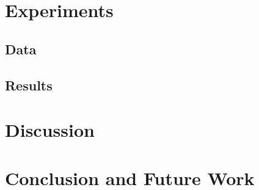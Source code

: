 \documentclass[runningheads]{llncs}
\begin{document}
\section{Experiments}
\subsection{Data}
\subsection{Results}
\section{Discussion}
\section{Conclusion and Future Work}

%
%



%
\end{document}
